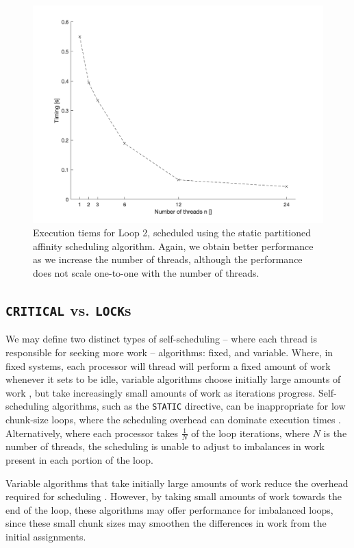 \documentclass{article} %
\newcommand{\tp}{\texttt}
\begin{document}
\begin{figure}
    \centering
    \includegraphics[width=.8\textwidth]{part2_plots/affinity_loop2}
    \caption{Execution tiems for Loop 2, scheduled using the static partitioned affinity scheduling algorithm. Again, we obtain better performance as we increase the number of threads, although the performance does not scale one-to-one with the number of threads.}
    \label{fig:affinityloop2}
\end{figure}


\subsection*{\tp{CRITICAL} vs. \tp{LOCK}s}\label{s:locks}

We may define two distinct types of self-scheduling -- where each thread is responsible for seeking more work -- algorithms: fixed, and variable.
Where, in fixed systems, each processor will thread will perform a fixed amount of work whenever it sets to be idle, variable algorithms choose initially large amounts of work , but take increasingly small amounts of work as iterations progress.
Self-scheduling algorithms, such as the \tp{STATIC} directive, can be inappropriate for low chunk-size loops, where the scheduling overhead can dominate execution times \citep{1701915}.
Alternatively, where each processor takes $\frac{1}{N}$ of the loop iterations, where $N$ is the number of threads, the scheduling is unable to adjust to imbalances in work present in each portion of the loop.

Variable algorithms that take initially large amounts of work reduce the overhead required for scheduling \citep{Eager1992AdaptiveGS, Polychronopoulos:1987:GSP:40938.40941}.
However, by taking small amounts of work towards the end of the loop, these algorithms may offer performance for imbalanced loops, since these small chunk sizes may smoothen the differences in work from the initial assignments.
\end{document}
